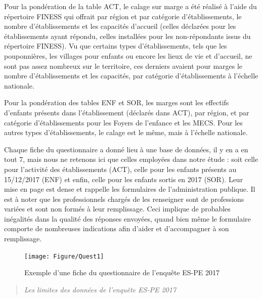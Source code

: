 \documentclass[
  12,
  a4paper,
]{report}
\begin{document}
\begin{mdframed}[frametitle=La pondération dans l’enquête ES-PE 2017]
Pour la pondération de la table ACT, le calage sur marge a été réalisé à l’aide du répertoire FINESS qui offrait par région et par catégorie d’établissements, le nombre d’établissements et les capacités d’accueil (celles déclarées pour les établissements ayant répondu, celles installées pour les non-répondants issus du répertoire FINESS). Vu que certains types d’établissements, tels que les pouponnières, les villages pour enfants ou encore les lieux de vie et d’accueil, ne sont pas assez nombreux sur le territoire, ces derniers avaient pour marges le nombre d'établissements et les capacités, par catégorie d'établissements à l’échelle nationale.

Pour la pondération des tables ENF et SOR, les marges sont les effectifs d'enfants présents dans l'établissement (déclarés dans ACT), par région, et par catégorie d'établissements pour les Foyers de l’enfance et les MECS. Pour les autres types d’établissements, le calage est le même, mais à l’échelle nationale.
\end{mdframed}

Chaque fiche du questionnaire a donné lieu à une base de données, il y
en a en tout 7, mais nous ne retenons ici que celles employées dans
notre étude : soit celle pour l'activité des établissements (ACT), celle
pour les enfants présents au 15/12/2017 (ENF) et enfin, celle pour les
enfants sortis en 2017 (SOR). Leur mise en page est dense et rappelle
les formulaires de l'administration publique. Il est à noter que les
professionnels chargés de les renseigner sont de professions variées et
sont non formés à leur remplissage. Ceci implique de probables
inégalités dans la qualité des réponses envoyées, quand bien même le
formulaire comporte de nombreuses indications afin d'aider et
d'accompagner à son remplissage.

\newpage

\begin{figure}

{\centering \texttt{[image: Figure/Quest1]} 

}

\caption{Exemple d’une fiche du questionnaire de l'enquête ES-PE 2017}\label{fig:unnamed-chunk-12}
\end{figure}

\begin{quote}
\emph{Les limites des données de l'enquête ES-PE 2017}
\end{quote}
\end{document}
